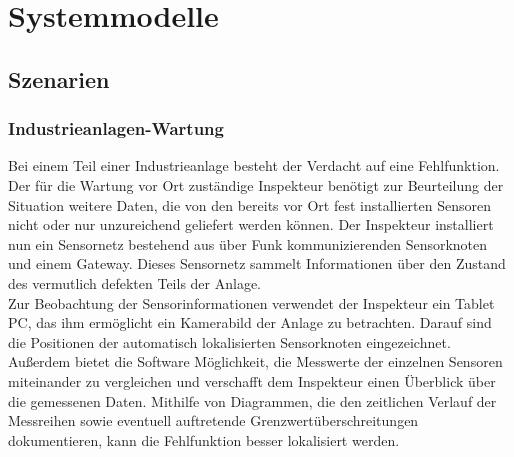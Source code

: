 \section{Systemmodelle}
\subsection{Szenarien}
\subsubsection{Industrieanlagen-Wartung}
Bei einem Teil einer Industrieanlage besteht der Verdacht auf eine Fehlfunktion. Der für die Wartung vor Ort zuständige Inspekteur benötigt zur Beurteilung der Situation weitere Daten, die von den bereits vor Ort fest installierten Sensoren nicht oder nur unzureichend geliefert werden können. Der Inspekteur installiert nun ein Sensornetz bestehend aus über Funk kommunizierenden Sensorknoten und einem Gateway. Dieses Sensornetz sammelt Informationen über den Zustand des vermutlich defekten Teils der Anlage.\\Zur Beobachtung der Sensorinformationen verwendet der Inspekteur ein Tablet PC, das ihm ermöglicht ein Kamerabild der Anlage zu betrachten. Darauf sind die Positionen der automatisch lokalisierten Sensorknoten eingezeichnet. Außerdem bietet die Software Möglichkeit, die Messwerte der einzelnen Sensoren miteinander zu vergleichen und verschafft dem Inspekteur einen Überblick über die gemessenen Daten. Mithilfe von Diagrammen, die den zeitlichen Verlauf der Messreihen sowie eventuell auftretende Grenzwertüberschreitungen dokumentieren, kann die Fehlfunktion besser lokalisiert werden.
\clearpage